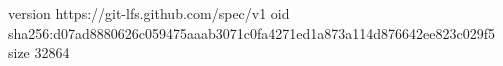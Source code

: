version https://git-lfs.github.com/spec/v1
oid sha256:d07ad8880626c059475aaab3071c0fa4271ed1a873a114d876642ee823c029f5
size 32864
